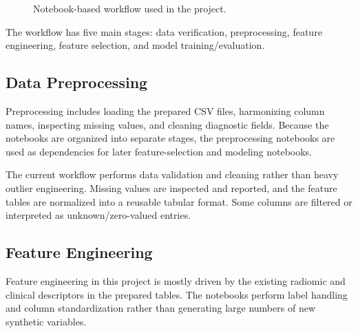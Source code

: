 \documentclass[11pt,a4paper]{article}
\begin{document}
\begin{figure}[H]
\centering
{}
\caption{Notebook-based workflow used in the project.}
\label{fig:workflow}
\end{figure}

The workflow has five main stages: data verification, preprocessing, feature engineering, feature selection, and model training/evaluation.

\subsection{Data Preprocessing}
Preprocessing includes loading the prepared CSV files, harmonizing column names, inspecting missing values, and cleaning diagnostic fields. Because the notebooks are organized into separate stages, the preprocessing notebooks are used as dependencies for later feature-selection and modeling notebooks.

The current workflow performs data validation and cleaning rather than heavy outlier engineering. Missing values are inspected and reported, and the feature tables are normalized into a reusable tabular format. Some columns are filtered or interpreted as unknown/zero-valued entries.

\subsection{Feature Engineering}
Feature engineering in this project is mostly driven by the existing radiomic and clinical descriptors in the prepared tables. The notebooks perform label handling and column standardization rather than generating large numbers of new synthetic variables.
\end{document}
